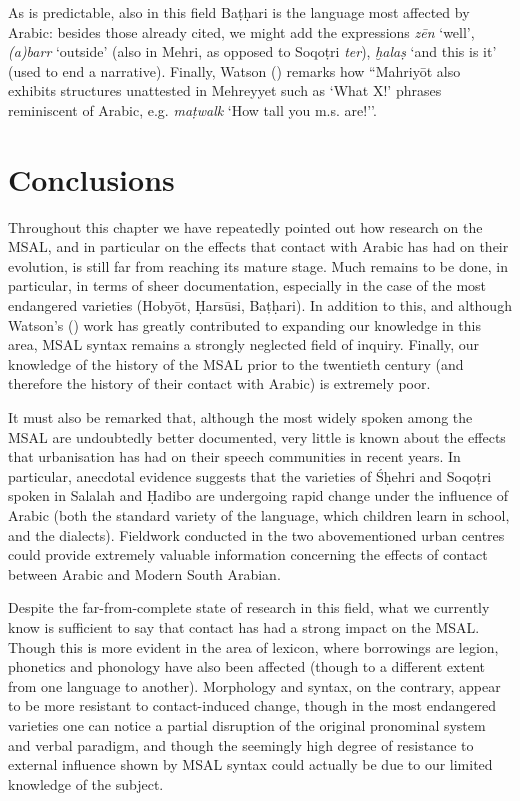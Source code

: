 \documentclass[output=paper]{langsci/langscibook}
\begin{document}
As is predictable, also in this field Baṭḥari is the language most affected by Arabic: besides those already cited, we might add the expressions \textit{zēn} ‘well’, \textit{(a)barr} ‘outside’ (also in Mehri, as opposed to Soqoṭri \textit{ter}), \textit{ḫalaṣ} ‘and this is it’ (used to end a narrative). Finally, Watson (\citeyear[3]{Watson2012}) remarks how ``Mahriyōt also exhibits structures unattested in Mehreyyet such as ‘What X!’ phrases reminiscent of Arabic, e.g. \textit{maṭwalk} ‘How tall you m.s. are!’’.

\section{Conclusions}\label{sec:4}

Throughout this chapter we have repeatedly pointed out how research on the MSAL, and in particular on the effects that contact with Arabic has had on their evolution, is still far from reaching its mature stage. Much remains to be done, in particular, in terms of sheer documentation, especially in the case of the most endangered varieties (Hobyōt, Ḥarsūsi, Baṭḥari). In addition to this, and although Watson’s (\citeyear{Watson2012}) work has greatly contributed to expanding our knowledge in this area, MSAL syntax remains a strongly neglected field of inquiry. Finally, our knowledge of the history of the MSAL prior to the twentieth century (and therefore the history of their contact with Arabic) is extremely poor. 

It must also be remarked that, although the most widely spoken among the MSAL are undoubtedly better documented, very little is known about the effects that urbanisation has had on their speech communities in recent years. In particular, anecdotal evidence suggests that the varieties of Śḥehri and Soqoṭri spoken in Salalah and Ḥadibo are undergoing rapid change under the influence of Arabic (both the standard variety of the language, which children learn in school, and the dialects). Fieldwork conducted in the two abovementioned urban centres could provide extremely valuable information concerning the effects of contact between Arabic and Modern South Arabian.

Despite the far-from-complete state of research in this field, what we currently know is sufficient to say that contact has had a strong impact on the MSAL. Though this is more evident in the area of lexicon, where borrowings are legion, phonetics and phonology have also been affected (though to a different extent from one language to another). Morphology and syntax, on the contrary, appear to be more resistant to contact-induced change, though in the most endangered varieties one can notice a partial disruption of the original pronominal system and verbal paradigm, and though the seemingly high degree of resistance to external influence shown by MSAL syntax could actually be due to our limited knowledge of the subject.
\end{document}
